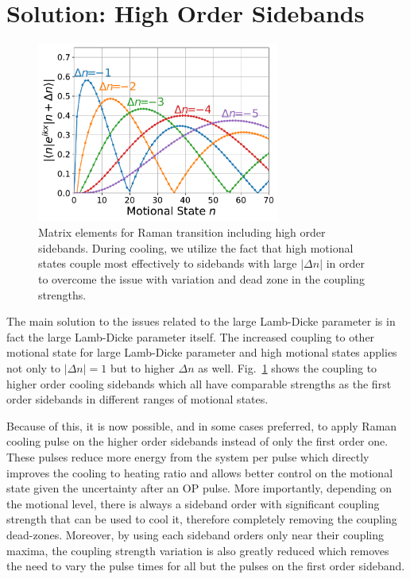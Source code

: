 \section{Solution: High Order Sidebands}
\label{ch:rsc:solution-high-orders}

\begin{figure}
  \centering
  \includegraphics[width=8cm]{figures/na_rsc_mele_raman.pdf}
  \caption[Raman coupling including high order sidebands]{
    Matrix elements for Raman transition including high order sidebands.
    During cooling, we utilize the fact that high motional states couple most effectively
    to sidebands with large $|\Delta n|$ in order to overcome the issue with
    variation and dead zone in the coupling strengths.
    \label{fig:rsc:na-mele-raman}}
\end{figure}

The main solution to the issues related to the large Lamb-Dicke parameter
is in fact the large Lamb-Dicke parameter itself.
The increased coupling to other motional state for large Lamb-Dicke parameter
and high motional states applies not only to $|\Delta n|=1$ but to higher $\Delta n$ as well.
Fig.~\ref{fig:rsc:na-mele-raman} shows the coupling to higher order cooling sidebands
which all have comparable strengths as the first order sidebands in different ranges
of motional states.

Because of this, it is now possible, and in some cases preferred, to apply Raman cooling pulse
on the higher order sidebands instead of only the first order one.
These pulses reduce more energy from the system per pulse which directly improves
the cooling to heating ratio and allows better control on the motional state
given the uncertainty after an OP pulse.
More importantly, depending on the motional level, there is always a sideband order
with significant coupling strength that can be used to cool it,
therefore completely removing the coupling dead-zones.
Moreover, by using each sideband orders only near their coupling maxima,
the coupling strength variation is also greatly reduced which removes
the need to vary the pulse times for all but the pulses on the first order sideband.

